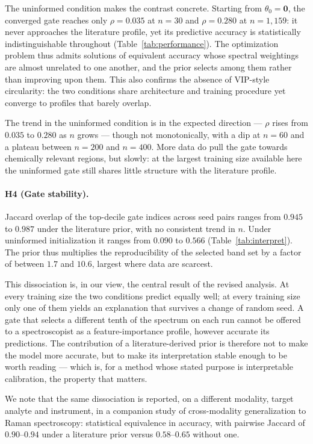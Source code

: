 \documentclass[preprint,12pt,hidelinks]{elsarticle}
\begin{document}
The uninformed condition makes the contrast concrete. Starting from
$\theta_0 = \mathbf{0}$, the converged gate reaches only $\rho = 0.035$ at
$n = 30$ and $\rho = 0.280$ at $n = 1{,}159$: it never approaches the
literature profile, yet its predictive accuracy is statistically
indistinguishable throughout (Table~\ref{tab:performance}). The optimization
problem thus admits solutions of equivalent accuracy whose spectral
weightings are almost unrelated to one another, and the prior selects among
them rather than improving upon them. This also confirms the absence of
VIP-style circularity: the two conditions share architecture and training
procedure yet converge to profiles that barely overlap.

The trend in the uninformed condition is in the expected direction --- $\rho$
rises from $0.035$ to $0.280$ as $n$ grows --- though not monotonically, with
a dip at $n = 60$ and a plateau between $n = 200$ and $n = 400$. More data do
pull the gate towards chemically relevant regions, but slowly: at the largest
training size available here the uninformed gate still shares little
structure with the literature profile.

\paragraph{H4 (Gate stability).}
Jaccard overlap of the top-decile gate indices across seed pairs ranges from
$0.945$ to $0.987$ under the literature prior, with no consistent trend in
$n$. Under uninformed initialization it ranges from $0.090$ to $0.566$
(Table~\ref{tab:interpret}). The prior thus multiplies the reproducibility of
the selected band set by a factor of between $1.7$ and $10.6$, largest where
data are scarcest.

This dissociation is, in our view, the central result of the revised
analysis. At every training size the two conditions predict equally well; at
every training size only one of them yields an explanation that survives a
change of random seed. A gate that selects a different tenth of the spectrum
on each run cannot be offered to a spectroscopist as a feature-importance
profile, however accurate its predictions. The contribution of a
literature-derived prior is therefore not to make the model more accurate,
but to make its interpretation stable enough to be worth reading --- which
is, for a method whose stated purpose is interpretable calibration, the
property that matters.

We note that the same dissociation is reported, on a different modality,
target analyte and instrument, in a companion study of cross-modality
generalization to Raman spectroscopy: statistical equivalence in accuracy,
with pairwise Jaccard of $0.90$--$0.94$ under a literature prior versus
$0.58$--$0.65$ without one.
\end{document}
